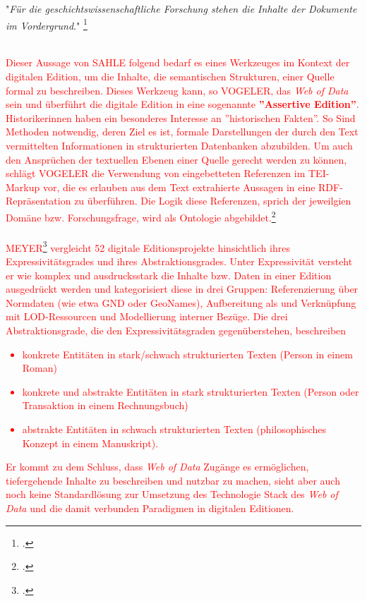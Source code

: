 \documentclass[12pt,a4paper]{article}
\begin{document}
"\textit{Für die geschichtswissenschaftliche Forschung stehen die Inhalte der Dokumente im Vordergrund}."
\footcite[][S.236]{sahle2017dhedition}
\\
\\
\textcolor{red}{
Dieser Aussage von SAHLE folgend bedarf es eines Werkzeuges im Kontext der digitalen Edition, um die Inhalte, die semantischen Strukturen, einer Quelle formal zu beschreiben. Dieses Werkzeug kann, so VOGELER, das \textit{Web of Data} sein und überführt die digitale Edition in eine sogenannte \textbf{''Assertive Edition''}.
\\  
Historikerinnen haben ein besonderes Interesse an ''historischen Fakten''. So Sind Methoden notwendig, deren Ziel es ist, formale Darstellungen der durch den Text vermittelten Informationen in strukturierten Datenbanken abzubilden. Um auch den Ansprüchen der textuellen Ebenen einer Quelle gerecht werden zu können, schlägt VOGELER die Verwendung von eingebetteten Referenzen im TEI-Markup vor, die es erlauben aus dem Text extrahierte Aussagen in eine RDF-Repräsentation zu überführen. Die Logik diese Referenzen, sprich der jeweilgien Domäne bzw. Forschungsfrage, wird als Ontologie abgebildet.\footcite[][]{vogeler2019assertive}
\\
\\
MEYER\footcite[][]{meyer2019datenmodellierung}   vergleicht 52 digitale Editionsprojekte hinsichtlich ihres Expressivitätsgrades und ihres Abstraktionsgrades. Unter Expressivität versteht er wie komplex und ausdrucksstark die Inhalte bzw. Daten in einer Edition ausgedrückt werden und kategorisiert diese in drei Gruppen:  Referenzierung über Normdaten (wie etwa GND oder GeoNames), Aufbereitung als und Verknüpfung mit LOD-Ressourcen und Modellierung interner Bezüge. Die drei Abstraktionsgrade, die den Expressivitätsgraden gegenüberstehen, beschreiben 
\begin{itemize}
\item konkrete Entitäten in stark/schwach strukturierten Texten (Person in einem Roman)
\item konkrete und abstrakte Entitäten in stark strukturierten Texten (Person oder Transaktion in einem Rechnungsbuch) 
\item 
abstrakte Entitäten in schwach strukturierten Texten (philosophisches Konzept in einem Manuskript).
\end{itemize}
Er kommt zu dem Schluss, dass \textit{Web of Data} Zugänge es ermöglichen, tiefergehende Inhalte zu beschreiben und nutzbar zu machen, sieht aber auch noch keine Standardlösung zur Umsetzung des Technologie Stack des \textit{Web of Data} und die damit verbunden Paradigmen in digitalen Editionen.
}
\end{document}
